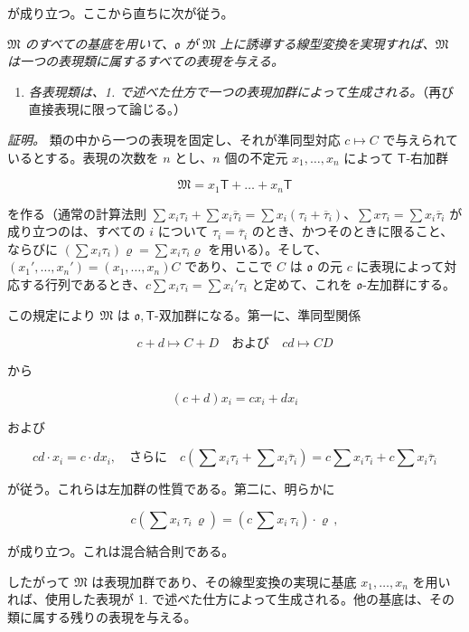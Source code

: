 が成り立つ。ここから直ちに次が従う。

\emph{$\mathfrak M$ のすべての基底を用いて、$\mathfrak{o}$ が $\mathfrak M$ 上に誘導する線型変換を実現すれば、$\mathfrak M$ は一つの表現類に属するすべての表現を与える。}

\begin{enumerate}
\def\labelenumi{\arabic{enumi}.}
\setcounter{enumi}{1}
\tightlist
\item
  \emph{各表現類は、1. で述べた仕方で一つの表現加群によって生成される。}（再び直接表現に限って論じる。）
\end{enumerate}

\emph{証明。} 類の中から一つの表現を固定し、それが準同型対応 $c\mapsto C$ で与えられているとする。表現の次数を $n$ とし、$n$ 個の不定元 $x_1,\ldots,x_n$ によって $\mathsf T$-右加群

\[\mathfrak{M} = x_1 \mathsf{T} + \dots + x_n \mathsf{T}\]

を作る（通常の計算法則 $\sum x_i\tau_i+\sum x_i\overline{\tau}_i=\sum x_i(\tau_i+\overline{\tau}_i)$、$\sum x\tau_i=\sum x_i\overline{\tau}_i$ が成り立つのは、すべての $i$ について $\tau_i=\overline{\tau}_i$ のとき、かつそのときに限ること、ならびに $(\sum x_i\tau_i)\varrho=\sum x_i\tau_i\varrho$ を用いる）。そして、$(x_1',\ldots,x_n')=(x_1,\ldots,x_n)C$ であり、ここで $C$ は $\mathfrak{o}$ の元 $c$ に表現によって対応する行列であるとき、$c\sum x_i\tau_i=\sum x_i'\tau_i$ と定めて、これを $\mathfrak{o}$-左加群にする。

この規定により $\mathfrak M$ は $\mathfrak{o},\mathsf T$-双加群になる。第一に、準同型関係

\[
c+d\mapsto C+D \quad \text{および} \quad cd\mapsto CD
\]

から

\[
(c+d)x_i=cx_i+dx_i
\]

および

\[
cd\cdot x_i=c\cdot dx_i,\quad\text{さらに}\quad
c\left(\sum x_i\tau_i+\sum x_i\overline{\tau}_i\right)
=c\sum x_i\tau_i+c\sum x_i\overline{\tau}_i
\]

が従う。これらは左加群の性質である。第二に、明らかに

\[c(\sum x_i \, \tau_i \, \varrho) = (c \, \sum x_i \, \tau_i) \cdot \varrho \,,\]

が成り立つ。これは混合結合則である。

したがって $\mathfrak M$ は表現加群であり、その線型変換の実現に基底 $x_1,\ldots,x_n$ を用いれば、使用した表現が 1. で述べた仕方によって生成される。他の基底は、その類に属する残りの表現を与える。

